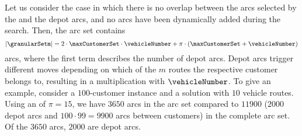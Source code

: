 \documentclass[11pt,a4paper,fleqn]{article}
\begin{document}
Let us consider the case in which there is no overlap between the arcs selected by the \sm and the depot arcs, and no arcs have been dynamically added during the search. Then, the \reduced arc set contains  
\begin{equation*} |\granularSetm| = 2 \cdot \maxCustomerSet \cdot \vehicleNumber + \pi \cdot (\maxCustomerSet+\vehicleNumber) \end{equation*} 
arcs, where the first term describes the number of depot arcs. Depot arcs trigger different moves depending on which of the $m$ routes the respective customer belongs to, resulting in a multiplication with $\vehicleNumber$. To give an example, consider a $100$-customer instance and a solution with $10$ vehicle routes. Using an \sfa of $\pi=15$, we have $3650$ arcs in the \reduced arc set compared to  $11900$ ($2000$ depot arcs and $100 \cdot 99 = 9900$ arcs between customers) in the complete arc set. Of the $3650$ arcs, $2000$ are depot arcs.
\end{document}
